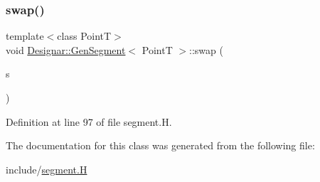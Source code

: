 \mbox{\label{class_designar_1_1_gen_segment_ac597d1811abeb7c572dfd81363c0d120}} 
\subsubsection{\texorpdfstring{swap()}{swap()}}
{\footnotesize\ttfamily template$<$class PointT$>$ \\
void \hyperlink{class_designar_1_1_gen_segment}{Designar\+::\+Gen\+Segment}$<$ PointT $>$\+::swap (\begin{DoxyParamCaption}\item[{\hyperlink{class_designar_1_1_gen_segment}{Gen\+Segment}$<$ PointT $>$ \&}]{s }\end{DoxyParamCaption})\hspace{0.3cm}{\ttfamily [inline]}}



Definition at line 97 of file segment.\+H.



The documentation for this class was generated from the following file\+:\begin{DoxyCompactItemize}
\item 
include/\hyperlink{segment_8_h}{segment.\+H}\end{DoxyCompactItemize}
